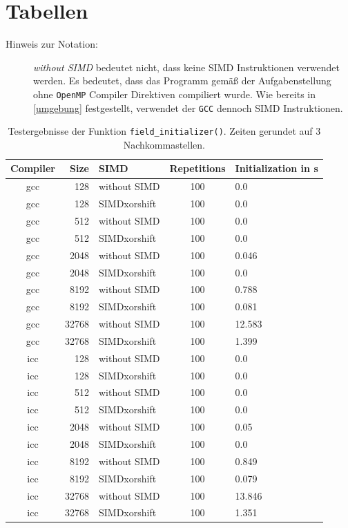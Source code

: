 \documentclass[german,plainarticle,hyperref,utf8]{zihpub}
\begin{document}
	\section{Tabellen} \label{tables}
	\begin{description}
		\item[Hinweis zur Notation:] \textit{without SIMD} bedeutet nicht, dass keine SIMD Instruktionen verwendet werden. Es bedeutet, dass das Programm gemäß der Aufgabenstellung ohne \texttt{OpenMP} Compiler Direktiven compiliert wurde. Wie bereits in \ref{umgebung} festgestellt, verwendet der \texttt{GCC} dennoch SIMD Instruktionen.
	\end{description}
	\begin{table}[h]
		\centering
			\begin{tabular}{||c r l c l||}
				\hline
				Compiler & Size  & SIMD & Repetitions & Initialization in s \\ [1ex]
				\hline\hline
				gcc & 128   & without SIMD & 100 & 0.0      \\ \hline
				gcc & 128   & SIMDxorshift & 100 & 0.0      \\ \hline
				gcc & 512   & without SIMD & 100 & 0.0      \\ \hline
				gcc & 512   & SIMDxorshift & 100 & 0.0      \\ \hline
				gcc & 2048  & without SIMD & 100 & 0.046   \\ \hline
				gcc & 2048  & SIMDxorshift & 100 & 0.0      \\ \hline
				gcc & 8192  & without SIMD & 100 & 0.788    \\ \hline
				gcc & 8192  & SIMDxorshift & 100 & 0.081    \\ \hline
				gcc & 32768 & without SIMD & 100 & 12.583  \\ \hline
				gcc & 32768 & SIMDxorshift & 100 & 1.399   \\ \hline \hline
				icc & 128   & without SIMD & 100 & 0.0      \\ \hline
				icc & 128   & SIMDxorshift & 100 & 0.0      \\ \hline
				icc & 512   & without SIMD & 100 & 0.0      \\ \hline
				icc & 512   & SIMDxorshift & 100 & 0.0      \\ \hline
				icc & 2048  & without SIMD & 100 & 0.05   \\ \hline
				icc & 2048  & SIMDxorshift & 100 & 0.0      \\ \hline
				icc & 8192  & without SIMD & 100 & 0.849    \\ \hline
				icc & 8192  & SIMDxorshift & 100 & 0.079    \\ \hline
				icc & 32768 & without SIMD & 100 & 13.846 \\ \hline
				icc & 32768 & SIMDxorshift & 100 & 1.351    \\ \hline
			\end{tabular}
			\caption{\label{tab:init}Testergebnisse der Funktion \texttt{field\_initializer()}. Zeiten gerundet auf 3 Nachkommastellen.}
	\end{table}
\end{document}
